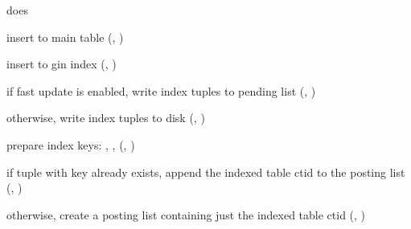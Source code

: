  does

\begin{nparts}
\item
  insert to main table (, )
\item
  insert to gin index (, )

  \begin{qparts}
  \item
    if fast update is enabled, write index tuples to pending list
    (, )
  \item
    otherwise, write index tuples to disk (,
    )

    \begin{iparts}
    \item
      prepare index keys: , ,
       (,
      )
    \item
      if tuple with key already exists, append the indexed table ctid to the
      posting list (,
      )
    \item
      otherwise, create a posting list containing just the indexed table ctid
      (, )
    \end{iparts}
  \end{qparts}
\end{nparts}
